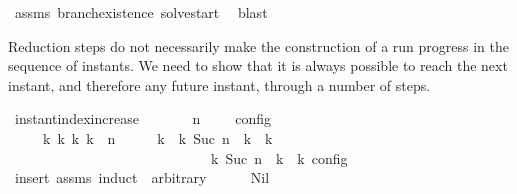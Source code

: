 \begin{isabellebody}
\ assms\ branch{\isacharunderscore}existence{\isacharprime}\ solve{\isacharunderscore}start\ \isamarkupfalse%
\ blast%
\endisatagproof
{\isafoldproof}%
%
\isadelimproof
%
\endisadelimproof
%
\isadelimdocument
%
\endisadelimdocument
%
\isatagdocument
%
\isamarkuptrue%
%
\endisatagdocument
{\isafolddocument}%
%
\isadelimdocument
%
\endisadelimdocument
%
\begin{isamarkuptext}%
Reduction steps do not necessarily make the construction of a run progress in the
  sequence of instants. We need to show that it is always possible to reach the next 
  instant, and therefore any future instant, through a number of steps.%
\end{isamarkuptext}\isamarkuptrue%
\isamarkupfalse%
\ instant{\isacharunderscore}index{\isacharunderscore}increase{\isacharcolon}\isanewline
\ \ \ {\isacartoucheopen}{\isasymrho}\ {\isasymin}\ {\isasymlbrakk}\ {\isasymGamma}{\isacharcomma}\ n\ {\isasymturnstile}\ {\isasymPsi}\ {\isasymtriangleright}\ {\isasymPhi}\ {\isasymrbrakk}\isactrlsub c\isactrlsub o\isactrlsub n\isactrlsub f\isactrlsub i\isactrlsub g{\isacartoucheclose}\isanewline
\ \ \ \ \ {\isacartoucheopen}{\isasymexists}{\isasymGamma}\isactrlsub k\ {\isasymPsi}\isactrlsub k\ {\isasymPhi}\isactrlsub k\ k{\isachardot}\ {\isacharparenleft}{\isacharparenleft}{\isasymGamma}{\isacharcomma}\ n\ {\isasymturnstile}\ {\isasymPsi}\ {\isasymtriangleright}\ {\isasymPhi}{\isacharparenright}\ \ {\isasymhookrightarrow}\isactrlbsup k\isactrlesup \ \ {\isacharparenleft}{\isasymGamma}\isactrlsub k{\isacharcomma}\ Suc\ n\ {\isasymturnstile}\ {\isasymPsi}\isactrlsub k\ {\isasymtriangleright}\ {\isasymPhi}\isactrlsub k{\isacharparenright}{\isacharparenright}\isanewline
\ \ \ \ \ \ \ \ \ \ \ \ \ \ \ \ \ \ \ \ \ \ \ \ \ {\isasymand}\ {\isasymrho}\ {\isasymin}\ {\isasymlbrakk}\ {\isasymGamma}\isactrlsub k{\isacharcomma}\ Suc\ n\ {\isasymturnstile}\ {\isasymPsi}\isactrlsub k\ {\isasymtriangleright}\ {\isasymPhi}\isactrlsub k\ {\isasymrbrakk}\isactrlsub c\isactrlsub o\isactrlsub n\isactrlsub f\isactrlsub i\isactrlsub g{\isacartoucheclose}\isanewline
%
\isadelimproof
%
\endisadelimproof
%
\isatagproof
{}\isamarkupfalse%
\ {\isacharparenleft}insert\ assms{\isacharcomma}\ induct\ {\isasymPsi}\ arbitrary{\isacharcolon}\ {\isasymGamma}\ {\isasymPhi}{\isacharparenright}\isanewline
\ \ \isamarkupfalse%
\ {\isacharparenleft}Nil\ {\isasymGamma}\ {\isasymPhi}{\isacharparenright}\isanewline
\ \ \ \ \isamarkupfalse%

\end{isabellebody}
